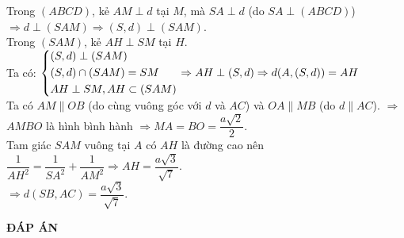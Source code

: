 \begin{bt}
{Trong $ (ABCD) $, kẻ $AM\perp d$ tại $ M $, mà $SA\perp d$ (do $SA\perp (ABCD)$) $\Rightarrow d\perp (SAM)\Rightarrow (S,d)\perp (SAM)$.\\
Trong $ (SAM) $, kẻ $AH\perp SM$ tại $ H $.\\
Ta có: $\left\{\begin{aligned}
 & (S,d)\perp (SAM) \\ 
 & (S,d)\cap (SAM)  =  SM \\ 
 & AH\perp SM,AH\subset (SAM) \\ 
\end{aligned}\right.\Rightarrow AH\perp (S,d)\Rightarrow d(A,(S,d))  =  AH$\\
Ta có $ AM \parallel OB $ (do cùng vuông góc với $ d $ và $ AC $) và $OA  \parallel MB$ (do $d \parallel AC$).
$\Rightarrow $ $ AMBO $ là hình bình hành $\Rightarrow MA  =  BO  =  \dfrac{a\sqrt{2}}{2}$.\\
Tam giác $ SAM $ vuông tại $ A $ có $  AH $ là đường cao nên $\dfrac{1}{AH^2}  =  \dfrac{1}{SA^2}  +  \dfrac{1}{AM^2}\Rightarrow AH  =  \dfrac{a\sqrt{3}}{\sqrt{7}}$. \\
$\Rightarrow d(SB,AC)  =  \dfrac{a\sqrt{3}}{\sqrt{7}}$. 

}
\end{bt}
\newpage
\begin{center}
\textbf{ĐÁP ÁN}
\end{center}
\begin{multicols}{10}
 
\end{multicols}


